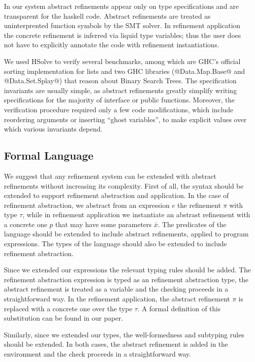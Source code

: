 In our system abstract refinements appear only on type specifications
and are transparent for the haskell code.
Abstract refinements are treated as uninterprented function
symbols by the SMT solver. 
In refinement application the concrete refinement is inferred via liquid 
type variables; thus the user does not have to explicitly annotate the code with refinement instantiations.

We used HSolve to verify 
several benchmarks, among which are GHC's official sorting implementation for lists
and two GHC libraries (@Data.Map.Base@ and @Data.Set.Splay@) that reason about Binary Search Trees.
The specification invariants are usually simple, as abstract refinements
greatly simplify writing specifications for the majority of interface or public functions.
Moreover, the verification procedure required only a few code modifications, 
which include reordering arguments or inserting ``ghost variables'', 
to make explicit values over which various invariants depend.

\subsection{Formal Language}
We suggest that any refinement system can be extended with abstract refinements
without increasing its complexity.
%
First of all, the syntax should be extended to support refinement abstraction
and application.
In the case of refinement abstraction, we abstract from an expression $e$
the refinement $\pi$ with type $\tau$, while in refinement application
we instantiate an abstrast refinement with a concrete one $p$
that may have some parameters $\bar{x}$.
%
The predicates of the language should be extended to 
include abstract refinements, applied to program expressions.
%
The types of the language should also be extended to include 
refinement abstraction.
%

Since we extended our expressions the relevant typing rules should be added.
The refinement abstraction expression is typed as an refinement abstraction
type, the abstract refinement is treated as a variable
and the checking proceeds in a straightforward way.
In the refinement application, the abstract refinement $\pi$ is replaced with a concrete one
over the type $\tau$. A formal definition of this substitution can be found in our paper\cite{Vazou13}.

Similarly, since we extended our types, the well-formedness and subtyping 
rules should be extended.
In both cases, the abstract refinement is added in the environment
and the check proceeds in a straightforward way.

